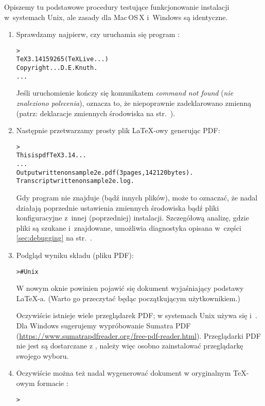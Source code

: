 \documentclass{article}
\begin{document}
Opiszemy tu podstawowe procedury testujące funkcjonowanie instalacji
w~systemach Unix, ale zasady dla Mac\,OS\,X{} i~Windows są identyczne.

\begin{enumerate}
\item Sprawdzamy najpierw, czy uruchamia się  program :
\begin{alltt}
> 
TeX 3.14159265 (TeX Live ...)
Copyright ... D.E. Knuth.
...
\end{alltt}
Jeśli uruchomienie kończy się  komunikatem \emph{command not found}
(\emph{nie znaleziono polecenia}), oznacza to, że niepoprawnie
zadeklarowano zmienną  (patrz: deklaracje zmiennych
środowiska na str.~\pageref{sec:env}).

\item Następnie przetwarzamy prosty plik \LaTeX-owy generując PDF:
\begin{alltt}
> 
This is pdfTeX 3.14...
...
Output written on sample2e.pdf (3 pages, 142120 bytes).
Transcript written on sample2e.log.
\end{alltt}
Gdy program nie znajduje  (bądź innych
plików), może to oznaczać, że nadal działają poprzednie ustawienia
zmiennych środowiska bądź pliki konfiguracyjne z~innej (poprzedniej) instalacji.
Szczegółową analizę, gdzie pliki są szukane i~znajdowane,
umożliwia diagnostyka opisana w~części \ref{sec:debugging} na
str.~\pageref{sec:debugging}.

\item Podgląd wyniku składu (pliku PDF):
\begin{alltt}
 >     # Unix
\end{alltt}

W  nowym oknie powinien pojawić się dokument wyjaśniający podstawy \LaTeX-a.
(Warto go przeczytać będąc początkującym użytkownikiem.)

Oczywiście istnieje wiele przeglądarek PDF; w systemach Unix używa się
 i~. Dla Windows sugerujemy
wypróbowanie Sumatra PDF (\url{https://www.sumatrapdfreader.org/free-pdf-reader.html}).
Przeglądarki PDF nie jest są dostarczane z \TL{}, należy więc osobno zainstalować przeglądarkę
swojego wyboru.

\item Oczywiście można też nadal wygenerować dokument w oryginalnym \TeX-owym formacie \dvi{}:
\begin{alltt}
> 
\end{alltt}


\end{enumerate}
\end{document}
